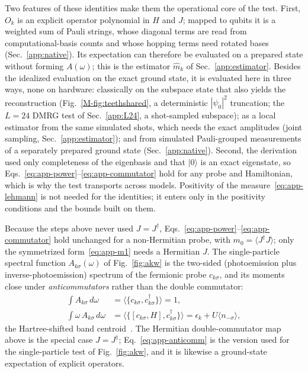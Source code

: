 \documentclass[aps,prb,onecolumn,superscriptaddress,longbibliography,floatfix]{revtex4-2}
\begin{document}
Two features of these identities make them the operational core of the test. First, $O_k$ is an explicit operator polynomial in $H$ and $J$; mapped to qubits it is a weighted sum of Pauli strings, whose diagonal terms are read from computational-basis counts and whose hopping terms need rotated bases (Sec.~\ref{app:native}). Its expectation can therefore be evaluated on a prepared state without forming $A(\omega)$; this is the estimator $\widehat{m}_k$ of Sec.~\ref{app:estimator}. Besides the idealized evaluation on the exact ground state, it is evaluated here in three ways, none on hardware: classically on the subspace state that also yields the reconstruction (Fig.~\ref{M-fig:teethshared}, a deterministic $|\psi_0|^2$ truncation; the $L=24$ DMRG test of Sec.~\ref{app:L24}, a shot-sampled subspace); as a local estimator from the same simulated shots, which needs the exact amplitudes (joint sampling, Sec.~\ref{app:estimator}); and from simulated Pauli-grouped measurements of a separately prepared ground state (Sec.~\ref{app:native}). Second, the derivation used only completeness of the eigenbasis and that $|0\rangle$ is an exact eigenstate, so Eqs.~\eqref{eq:app-power}--\eqref{eq:app-commutator} hold for any probe and Hamiltonian, which is why the test transports across models. Positivity of the measure~\eqref{eq:app-lehmann} is not needed for the identities; it enters only in the positivity conditions and the bounds built on them.

Because the steps above never used $J=J^\dagger$, Eqs.~\eqref{eq:app-power}--\eqref{eq:app-commutator} hold unchanged for a non-Hermitian probe, with $m_0=\langle J^\dagger J\rangle$; only the symmetrized form~\eqref{eq:app-m1} needs a Hermitian $J$. The single-particle spectral function $A_{k\sigma}(\omega)$ of Fig.~\ref{fig:akw} is the two-sided (photoemission plus inverse-photoemission) spectrum of the fermionic probe $c_{k\sigma}$, and its moments close under \emph{anticommutators} rather than the double commutator:
\begin{equation}
\begin{aligned}
\int A_{k\sigma}\,d\omega&=\big\langle\{c_{k\sigma},c_{k\sigma}^\dagger\}\big\rangle=1,\\
\int \omega\,A_{k\sigma}\,d\omega&=\big\langle\{[c_{k\sigma},H],c_{k\sigma}^\dagger\}\big\rangle=\epsilon_k+U\langle n_{-\sigma}\rangle,
\end{aligned}
\label{eq:app-anticomm}
\end{equation}
the Hartree-shifted band centroid~\cite{Freericks2009}. The Hermitian double-commutator map above is the special case $J=J^\dagger$; Eq.~\eqref{eq:app-anticomm} is the version used for the single-particle test of Fig.~\ref{fig:akw}, and it is likewise a ground-state expectation of explicit operators.
\end{document}

